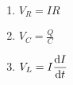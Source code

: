 

\vspace*{\fill}
\centering

\begin{enumerate}
    \item $V_{R} = IR$ 
    \item $\displaystyle V_{C} = \frac{Q}{C}$
    \item $\displaystyle V_{L} = I \dv{I}{t}$
\end{enumerate}

\centering
\vspace*{\fill}

